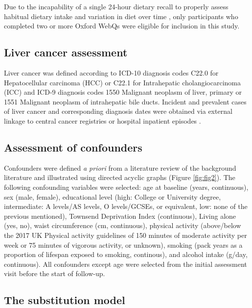 \documentclass[sn-basic,Numbered,iicol,pdflatex]{sn-jnl}
\begin{document}
Due to the incapability of a single 24-hour dietary recall to properly
assess habitual dietary intake and variation in diet over time
\citep{thompson2013, gurinovic2017}, only participants who completed two or
more Oxford WebQs were eligible for inclusion in this study.

\hypertarget{subsec3}{%
\subsection{Liver cancer assessment}\label{subsec3}}

Liver cancer was defined according to ICD-10 diagnosis codes C22.0 for
Hepatocellular carcinoma (HCC) or C22.1 for Intrahepatic
cholangiocarcinoma (ICC) and ICD-9 diagnosis codes 1550 Malignant
neoplasm of liver, primary or 1551 Malignant neoplasm of intrahepatic
bile ducts. Incident and prevalent cases of liver cancer and
corresponding diagnosis dates were obtained via external linkage to
central cancer registries or hospital inpatient episodes \citep{RN112, RN114}.

\hypertarget{subsec4}{%
\subsection{Assessment of confounders}\label{subsec4}}

Confounders were defined \emph{a priori} from a literature review of the
background literature and illustrated using directed acyclic graphs
(Figure \ref{fig:fig2}). The following confounding variables were
selected: age at baseline (years, continuous), sex (male, female),
educational level (high: College or University degree, intermediate: A
levels/AS levels, O levels/GCSEs, or equivalent, low: none of the
previous mentioned), Townsend Deprivation Index (continuous), Living
alone (yes, no), waist circumference (cm, continuous), physical activity
(above/below the 2017 UK Physical activity guidelines of 150 minutes of
moderate activity per week or 75 minutes of vigorous activity, or
unknown), smoking (pack years as a proportion of lifespan exposed to
smoking, continous), and alcohol intake (g/day, continuous). All
confounders except age were selected from the initial assessment visit
before the start of follow-up.

\hypertarget{subsec5}{%
\subsection{The substitution model}\label{subsec5}}
\end{document}
